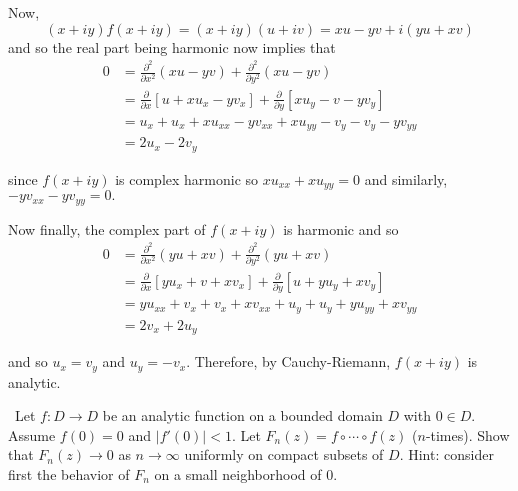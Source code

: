 \documentclass[12pt]{Qual}
\begin{document}
\begin{solution}
\begin{enumerate}[label=(\alph*)]
     Now, $$(x+iy)f(x+iy)=(x+iy)(u+iv)=xu-yv+i(yu+xv)$$ and so the real part being harmonic now implies that \begin{align*}
        0&=\frac{\partial^2}{\partial x^2}(xu-yv)+\frac{\partial^2}{\partial y^2}(xu-yv)\\
        &=\frac{\partial}{\partial x}\left[u+xu_x-yv_x\right]+\frac{\partial}{\partial y}\left[xu_y-v-yv_y\right]\\
        &=u_x+u_x+xu_{xx}-yv_{xx}+xu_{yy}-v_y-v_y-yv_{yy}\\
        &=2u_x-2v_y
    \end{align*}

    since $f(x+iy)$ is complex harmonic so $xu_{xx}+xu_{yy}=0$ and similarly, $-yv_{xx}-yv_{yy}=0.$

    Now finally, the complex part of $f(x+iy)$ is harmonic and so \begin{align*}
        0&=\frac{\partial^2}{\partial x^2}(yu+xv)+\frac{\partial^2}{\partial y^2}(yu+xv)\\
        &=\frac{\partial}{\partial x}\left[yu_x+v+xv_x\right]+\frac{\partial}{\partial y}\left[u+yu_y+xv_y\right]\\
        &=yu_{xx}+v_x+v_x+xv_{xx}+u_y+u_y+yu_{yy}+xv_{yy}\\
        &=2v_x+2u_y
    \end{align*}

    and so $u_x=v_y$ and $u_y=-v_x$. Therefore, by Cauchy-Riemann, $f(x+iy)$ is analytic.
\end{enumerate}
\end{solution}
\newpage

\begin{problem} $\,$
Let $f:D\to D$ be an analytic function on a bounded domain $D$ with $0\in D$. Assume $f(0)=0$ and $|f'(0)|<1$. Let $F_n(z)=f\circ \cdots\circ f(z)$ ($n$-times). Show that $F_n(z)\to0$ as $n\to\infty$ uniformly on compact subsets of $D$. Hint: consider first the behavior of $F_n$ on a small neighborhood of $0.$
\end{problem}
\end{document}
